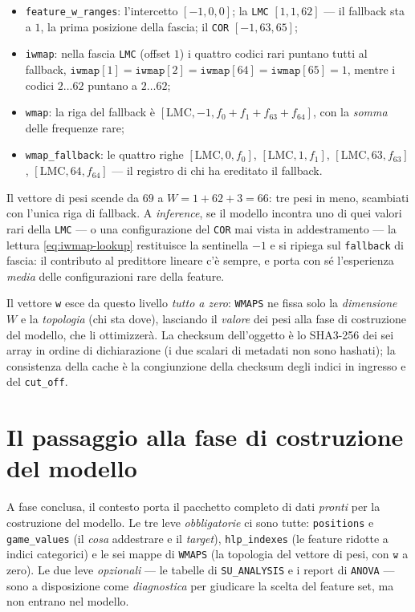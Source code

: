 \begin{itemize}
  \item \texttt{feature\_w\_ranges}: l'intercetto $[-1, 0, 0]$; la
        \texttt{LMC} $[1, 1, 62]$ — il fallback sta a $1$, la prima
        posizione della fascia; il \texttt{COR} $[-1, 63, 65]$;
  \item \texttt{iwmap}: nella fascia \texttt{LMC} (offset $1$) i quattro
        codici rari puntano tutti al fallback,
        $\texttt{iwmap}[1] = \texttt{iwmap}[2] = \texttt{iwmap}[64] =
        \texttt{iwmap}[65] = 1$, mentre i codici $2 \ldots 62$ puntano a
        $2 \ldots 62$;
  \item \texttt{wmap}: la riga del fallback è
        $[\text{LMC}, -1, f_0 + f_1 + f_{63} + f_{64}]$, con la \emph{somma}
        delle frequenze rare;
  \item \texttt{wmap\_fallback}: le quattro righe
        $[\text{LMC}, 0, f_0]$, $[\text{LMC}, 1, f_1]$,
        $[\text{LMC}, 63, f_{63}]$, $[\text{LMC}, 64, f_{64}]$ — il registro
        di chi ha ereditato il fallback.
\end{itemize}

Il vettore di pesi scende da $69$ a $W = 1 + 62 + 3 = 66$: tre pesi in
meno, scambiati con l'unica riga di fallback. A \emph{inference}, se il
modello incontra uno di quei valori rari della \texttt{LMC} — o una
configurazione del \texttt{COR} mai vista in addestramento — la lettura
\eqref{eq:iwmap-lookup} restituisce la sentinella $-1$ e si ripiega sul
\texttt{fallback} di fascia: il contributo al predittore lineare c'è
sempre, e porta con sé l'esperienza \emph{media} delle configurazioni rare
della feature.

Il vettore \texttt{w} esce da questo livello \emph{tutto a zero}:
\texttt{WMAPS} ne fissa solo la \emph{dimensione} $W$ e la
\emph{topologia} (chi sta dove), lasciando il \emph{valore} dei pesi alla
fase di costruzione del modello, che li ottimizzerà. La checksum dell'oggetto
è lo SHA3-256 dei sei array in ordine di dichiarazione (i due scalari di
metadati non sono hashati); la consistenza della cache è la congiunzione della
checksum degli indici in ingresso e del \texttt{cut\_off}.

\section{Il passaggio alla fase di costruzione del modello}

A fase conclusa, il contesto porta il pacchetto completo di dati
\emph{pronti} per la costruzione del modello. Le tre leve
\emph{obbligatorie} ci sono tutte: \texttt{positions} e
\texttt{game\_values} (il \emph{cosa} addestrare e il \emph{target}),
\texttt{hlp\_indexes} (le feature ridotte a indici categorici) e le sei mappe
di \texttt{WMAPS} (la topologia del vettore di pesi, con $\texttt{w}$ a
zero). Le due leve \emph{opzionali} — le tabelle di
\texttt{SU\_ANALYSIS} e i report di \texttt{ANOVA} — sono a disposizione
come \emph{diagnostica} per giudicare la scelta del feature set, ma non
entrano nel modello.

